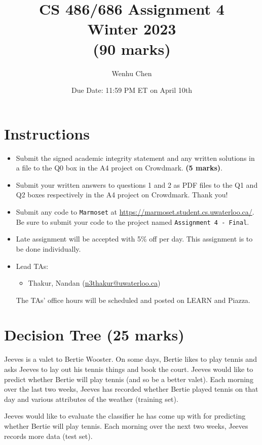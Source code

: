 \documentclass[12pt]{article}
\title{CS 486/686 Assignment 4 \\ Winter 2023 \\ (90 marks)}
\author{Wenhu Chen}
\date{Due Date: 11:59 PM ET on April 10th}
\begin{document}
\maketitle

\section*{Instructions}

\begin{itemize}
\item
Submit the signed academic integrity statement and any written solutions in a file to the Q0 box in the A4 project on Crowdmark. \textbf{(5 marks)}.

\item Submit your written answers to questions 1 and 2 as PDF files to the Q1 and Q2 boxes respectively in the A4 project on Crowdmark. Thank you!

\item Submit any code to \verb+Marmoset+ at \url{https://marmoset.student.cs.uwaterloo.ca/}. Be sure to submit your code to the project named \texttt{Assignment 4 - Final}. 

\item
Late assignment will be accepted with 5\% off per day. This assignment is to be done individually.

\item
Lead TAs: 
\begin{itemize}
\item 
Thakur, Nandan (\url{n3thakur@uwaterloo.ca})
\end{itemize}
The TAs' office hours will be scheduled and posted on LEARN and Piazza.
\end{itemize}



\newpage

\section{Decision Tree (25 marks)}

Jeeves is a valet to Bertie Wooster.  On some days, Bertie likes to play tennis and asks Jeeves to lay out his tennis things and book the court.  Jeeves would like to predict whether Bertie will play tennis (and so be a better valet).  Each morning over the last two weeks, Jeeves has recorded whether Bertie played tennis on that day and various attributes of the weather (training set).

\vspace{1em}
Jeeves would like to evaluate the classifier he has come up with for predicting whether Bertie will play tennis.  Each morning over the next two weeks, Jeeves records more data (test set).
\end{document}
